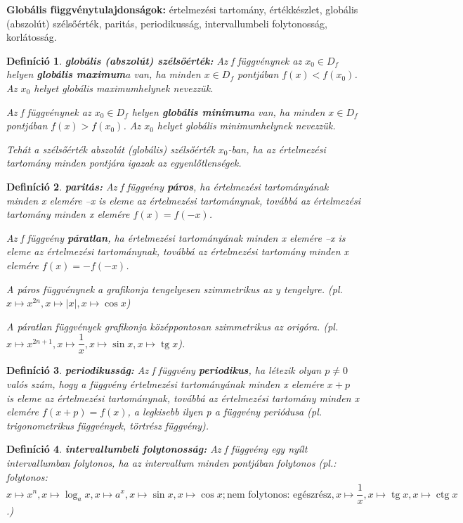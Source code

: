 \documentclass[12pt,a4paper]{article}
\newtheorem{definition}{Definíció} [section]
\DeclareMathOperator{\tg}{tg}
\DeclareMathOperator{\ctg}{ctg}
\begin{document}
\textbf{Globális függvénytulajdonságok:} értelmezési tartomány, értékkészlet, globális (abszolút) szélsőérték, paritás, periodikusság, intervallumbeli folytonosság, korlátosság.

\begin{definition}
\textbf{globális (abszolút) szélsőérték:} Az f függvénynek az $x_0 \in D_f$ helyen \textbf{globális maximum}a van, ha minden $x \in D_f$ pontjában $f(x) < f(x_0)$. Az $x_0$ helyet globális maximumhelynek nevezzük.

Az f függvénynek az $x_0 \in D_f$ helyen \textbf{globális minimum}a van, ha minden $x \in D_f$ pontjában $f(x) > f(x_0)$. Az $x_0$ helyet globális minimumhelynek nevezzük.

Tehát a szélsőérték abszolút (globális) szélsőérték $x_0$-ban, ha az értelmezési tartomány minden pontjára igazak az egyenlőtlenségek.
\end{definition}

\begin{definition}
\textbf{paritás:} Az f függvény \textbf{páros}, ha értelmezési tartományának minden x elemére –x is eleme az értelmezési tartománynak, továbbá az értelmezési tartomány minden x elemére $f(x) = f(-x)$.

Az f függvény \textbf{páratlan}, ha értelmezési tartományának minden x elemére –x is eleme az értelmezési tartománynak, továbbá az értelmezési tartomány minden x elemére $f(x) = -f(-x)$.

A páros függvénynek a grafikonja tengelyesen szimmetrikus az y tengelyre. (pl. $x \mapsto x^{2n}, x \mapsto |x|, x \mapsto \cos x$)

A páratlan függvények grafikonja középpontosan szimmetrikus az origóra. (pl. $x \mapsto x ^{2n + 1}, x \mapsto \dfrac{1}{x} , x \mapsto \sin x, x \mapsto \tg x$).
\end{definition}

\begin{definition}
\textbf{periodikusság:} Az f függvény \textbf{periodikus}, ha létezik olyan $p \neq 0$ valós szám, hogy a függvény értelmezési tartományának minden x elemére $x + p$ is eleme az értelmezési tartománynak, továbbá az értelmezési tartomány minden x elemére $f(x + p) = f(x)$, a legkisebb ilyen p a függvény periódusa (pl. trigonometrikus függvények, törtrész függvény).
\end{definition}

\begin{definition}
\textbf{intervallumbeli folytonosság:} Az f függvény egy nyílt intervallumban folytonos, ha az intervallum minden pontjában folytonos (pl.: folytonos: $x \mapsto x^n, x \mapsto \log_a x, x \mapsto a^x, x \mapsto \sin x, x \mapsto \cos x; \text{nem folytonos: egészrész}, x \mapsto \dfrac{1}{x} , x \mapsto \tg x, x \mapsto \ctg x$.)
\end{definition}
\end{document}
